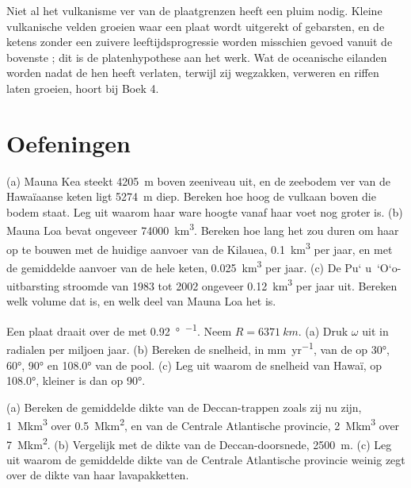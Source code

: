 Niet al het vulkanisme ver van de plaatgrenzen heeft een pluim nodig. Kleine vulkanische velden groeien waar een plaat wordt uitgerekt of gebarsten, en de ketens zonder een zuivere leeftijdsprogressie worden misschien gevoed vanuit de bovenste ; dit is de platenhypothese aan het werk. Wat de oceanische eilanden worden nadat de  hen heeft verlaten, terwijl zij wegzakken, verweren en riffen laten groeien, hoort bij Boek 4.

\section{Oefeningen}

\begin{exercise}[$\star$]\label{exo:b1:hotspots:1}
(a) Mauna Kea steekt \qty{4205}{m} boven zeeniveau uit, en de zeebodem ver van de Hawaïaanse keten ligt \qty{5274}{m} diep. Bereken hoe hoog de vulkaan boven die bodem staat. Leg uit waarom haar ware hoogte vanaf haar voet nog groter is. (b) Mauna Loa bevat ongeveer \qty{74000}{km^3}. Bereken hoe lang het zou duren om haar op te bouwen met de huidige aanvoer van de Kilauea, \qty{0.1}{km^3} per jaar, en met de gemiddelde aanvoer van de hele keten, \qty{0.025}{km^3} per jaar. (c) De Pu\textquoteleft
u~\textquoteleft O\textquoteleft o-uitbarsting stroomde van 1983 tot 2002 ongeveer \qty{0.12}{km^3} per jaar uit. Bereken welk volume dat is, en welk deel van Mauna Loa het is.
\end{exercise}

\begin{exercise}[$\star$]\label{exo:b1:hotspots:2}
Een plaat draait over de  met \qty{0.92}{\degree\per\Myr}. Neem $R = \qty{6371}{km}$. (a) Druk $\omega$ uit in radialen per miljoen jaar. (b) Bereken de snelheid, in \unit{mm.yr^{-1}}, van de  op \ang{30}, \ang{60}, \ang{90} en \ang{108.0} van de pool. (c) Leg uit waarom de snelheid van Hawaï, op \ang{108.0}, kleiner is dan op \ang{90}.
\end{exercise}

\begin{exercise}[$\star$]\label{exo:b1:hotspots:3}
(a) Bereken de gemiddelde dikte van de Deccan-trappen zoals zij nu zijn, \qty{1}{\mega km^3} over \qty{0.5}{\mega km^2}, en van de Centrale Atlantische provincie, \qty{2}{\mega km^3} over \qty{7}{\mega km^2}. (b) Vergelijk met de dikte van de Deccan-doorsnede, \qty{2500}{m}. (c) Leg uit waarom de gemiddelde dikte van de Centrale Atlantische provincie weinig zegt over de dikte van haar lavapakketten.
\end{exercise}


